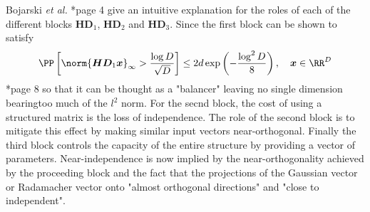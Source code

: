 
Bojarski {\it et al.} \cite{BojarskiMariusz2016Saar}*{page 4} give an intuitive explanation for the roles of each of the different blocks $\bm{H} \bm{D}_1$, $\bm{H} \bm{D}_2$ and $\bm{H} \bm{D}_3$. Since the first block can be shown to satisfy
\[
    \PP \left[ \norm{\bm{H}\bm{D}_1 \bm{x}}_{\infty} > \frac{\log D}{\sqrt{D}} \right] \leq 2 d \exp \left( {-\frac{\log^2 D}{8}} \right), \quad \bm{x} \in \RR^D
\]
\cite{LiuFanghui2021RFfK}*{page 8} so that it can be thought as a "balancer" leaving no single dimension bearingtoo much of the $l^2$ norm. For the secnd block, the cost of using a structured matrix is the loss of independence. The role of the second block is to mitigate this effect by making similar input vectors near-orthogonal. Finally the third block controls the capacity of the entire structure by providing a vector of parameters. Near-independence is now implied by the near-orthogonality achieved by the proceeding block and the fact that the projections of the Gaussian vector or Radamacher vector onto "almost orthogonal directions" and "close to independent".